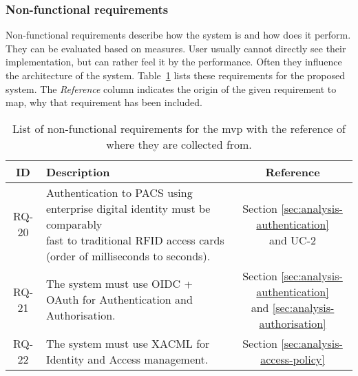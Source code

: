 \subsubsection{Non-functional requirements} \label{sec:analysis-nonfunctional}
Non-functional requirements describe how the system is and how does it perform. They can be evaluated based on measures. User usually cannot directly see their implementation, but can rather feel it by the performance. Often they influence the architecture of the system. Table~\ref{tab:nonfunctional-requirements} lists these requirements for the proposed system. The \textit{Reference} column indicates the origin of the given requirement to map, why that requirement has been included.

\begin{table}[ht]
    \footnotesize
    \onehalfspacing
    \centering
    \begin{tabular}{|c|p{12cm}|c|}
    \hline
    \cellcolor[HTML]{CBCEFB}\textbf{ID}&\cellcolor[HTML]{CBCEFB}\textbf{Description}&\cellcolor[HTML]{CBCEFB}\textbf{Reference}\\
    \hline
    RQ-20&\makecell{Authentication to PACS using enterprise digital identity must be comparably\\ fast to traditional RFID access cards (order of milliseconds to seconds).}&\makecell{Section \ref{sec:analysis-authentication} \\ and UC-2}\\
    \hline
    RQ-21&The system must use OIDC + OAuth for Authentication and Authorisation.&\makecell{Section \ref{sec:analysis-authentication} \\ and \ref{sec:analysis-authorisation}}\\
    \hline
    RQ-22&The system must use XACML for Identity and Access management.&Section \ref{sec:analysis-access-policy}\\
    \hline
    \end{tabular}
    \caption{List of non-functional requirements for the \acrshort{mvp} with the reference of where they are collected from.}
    \label{tab:nonfunctional-requirements}
\end{table}